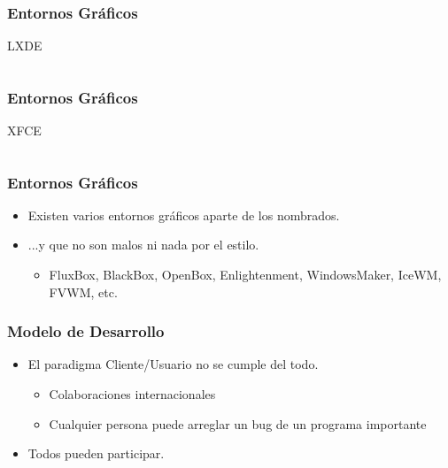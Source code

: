 \frame
{
\frametitle{Entornos Gráficos}
\Large{LXDE}
\begin{columns}
	\begin{column}{0.2\textwidth}
	\end{column}
	\begin{column}{0.8\textwidth}
		\begin{center}
		\end{center}
	\end{column}
\end{columns}
}

\frame
{
\frametitle{Entornos Gráficos}
\Large{XFCE}
\begin{columns}
	\begin{column}{0.2\textwidth}
	\end{column}
	\begin{column}{0.8\textwidth}
		\begin{center}
		\end{center}
	\end{column}
\end{columns}
}

\frame
{
\frametitle{Entornos Gráficos}
\begin{itemize}
	\item Existen varios entornos gráficos aparte de los nombrados.
	\item ...y que no son malos ni nada por el estilo.
	\begin{itemize}
		\item FluxBox, BlackBox, OpenBox, Enlightenment, WindowsMaker, IceWM, FVWM, etc.
	\end{itemize}
\end{itemize}
}

\frame
{
\frametitle{Modelo de Desarrollo}
\begin{itemize}
	\item El paradigma Cliente/Usuario no se cumple del todo.
	\begin{itemize}
		\item Colaboraciones internacionales
		\item Cualquier persona puede arreglar un bug de un programa importante
	\end{itemize}
	\item Todos pueden participar.
\end{itemize}
}


